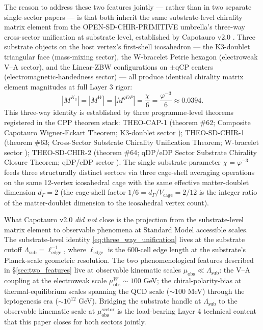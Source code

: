 \documentclass[11pt,letterpaper]{article}
\newcommand{\Lambdasub}{\Lambda_{\text{sub}}}
\newcommand{\muobs}{\mu_{\text{obs}}}
\newcommand{\elledge}{\ell_{\text{edge}}}
\newcommand{\Vcage}{V_{\text{cage}}}
\newcommand{\dGamma}{d_\Gamma}
\begin{document}
The reason to address these two features jointly --- rather than in two separate single-sector papers --- is that both inherit the same substrate-level chirality matrix element from the OPEN-SD-CHIR-PRIMITIVE umbrella's three-way cross-sector unification at substrate level, established by Capotauro v2.0 \cite{Capotauro}. Three substrate objects on the host vertex's first-shell icosahedron --- the K3-doublet triangular face (mass-mixing sector), the W-bracelet Petrie hexagon (electroweak V--A sector), and the Linear-ZBW configurations on $\pm$qCP centers (electromagnetic-handedness sector) --- all produce identical chirality matrix element magnitudes at full Layer 3 rigor:
\begin{equation}
\left| M^{K_3} \right| = \left| M^W \right| = \left| M^{qDP} \right| = \frac{\chi}{6} = \frac{\varphi^{-3}}{6} \approx 0.0394.
\label{eq:three_way_unification}
\end{equation}
This three-way identity is established by three programme-level theorems registered in the CPP theorem stack: THEO-CAP-1 (theorem \#62; Composite Capotauro Wigner-Eckart Theorem; K3-doublet sector \cite{Capotauro, AbshierCPP2026}); THEO-SD-CHIR-1 (theorem \#63; Cross-Sector Substrate Chirality Unification Theorem; W-bracelet sector \cite{Capotauro}); THEO-SD-CHIR-2 (theorem \#64; qDP/eDP Sector Substrate Chirality Closure Theorem; qDP/eDP sector \cite{Capotauro}). The single substrate parameter $\chi = \varphi^{-3}$ feeds three structurally distinct sectors via three cage-shell averaging operations on the same 12-vertex icosahedral cage with the same effective matter-doublet dimension $\dGamma = 2$ (the cage-shell factor $1/6 = \dGamma/\Vcage = 2/12$ is the integer ratio of the matter-doublet dimension to the icosahedral vertex count).

What Capotauro v2.0 \emph{did not} close is the projection from the substrate-level matrix element to observable phenomena at Standard Model accessible scales. The substrate-level identity \eqref{eq:three_way_unification} lives at the substrate cutoff $\Lambdasub = \elledge^{-1}$, where $\elledge$ is the 600-cell edge length at the substrate's Planck-scale geometric resolution. The two phenomenological features described in §\ref{sec:two_features} live at observable kinematic scales $\muobs \ll \Lambdasub$: the V--A coupling at the electroweak scale $\muobs^W \sim 100$ GeV; the chiral-polarity-bias at thermal-equilibrium scales spanning the QCD scale ($\sim 100$ MeV) through the leptogenesis era ($\sim 10^{12}$ GeV). Bridging the substrate handle at $\Lambdasub$ to the observable kinematic scale at $\muobs^{\text{sector}}$ is the load-bearing Layer 4 technical content that this paper closes for both sectors jointly.
\end{document}

